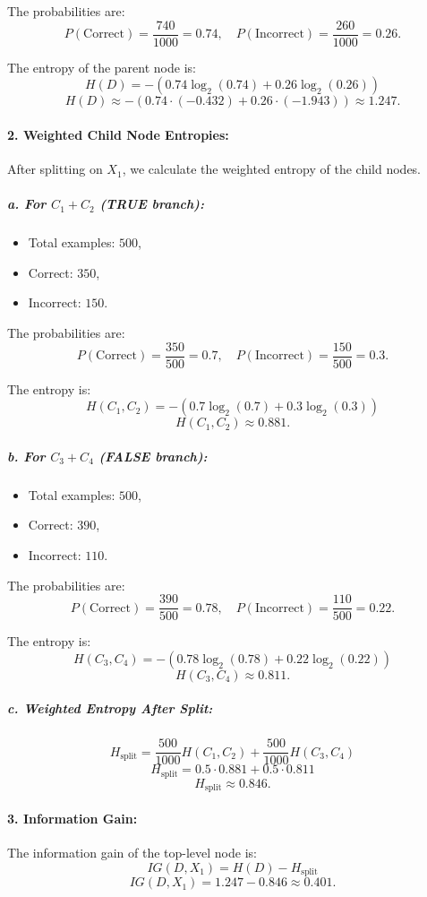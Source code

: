 \documentclass[10pt,a4paper]{article}
\begin{document}
The probabilities are:
\[
P(\text{Correct}) = \frac{740}{1000} = 0.74, \quad P(\text{Incorrect}) = \frac{260}{1000} = 0.26.
\]

The entropy of the parent node is:
\[
H(D) = - \left( 0.74 \log_2(0.74) + 0.26 \log_2(0.26) \right)
\]
\[
H(D) \approx - \left( 0.74 \cdot (-0.432) + 0.26 \cdot (-1.943) \right) \approx 1.247.
\]

\paragraph{2. Weighted Child Node Entropies:}
After splitting on \(X_1\), we calculate the weighted entropy of the child nodes.

\subparagraph{a. For \(C_1 + C_2\) (TRUE branch):}
\begin{itemize}
    \item Total examples: \(500\),
    \item Correct: \(350\),
    \item Incorrect: \(150\).
\end{itemize}

The probabilities are:
\[
P(\text{Correct}) = \frac{350}{500} = 0.7, \quad P(\text{Incorrect}) = \frac{150}{500} = 0.3.
\]

The entropy is:
\[
H(C_1, C_2) = - \left( 0.7 \log_2(0.7) + 0.3 \log_2(0.3) \right)
\]
\[
H(C_1, C_2) \approx 0.881.
\]

\subparagraph{b. For \(C_3 + C_4\) (FALSE branch):}
\begin{itemize}
    \item Total examples: \(500\),
    \item Correct: \(390\),
    \item Incorrect: \(110\).
\end{itemize}

The probabilities are:
\[
P(\text{Correct}) = \frac{390}{500} = 0.78, \quad P(\text{Incorrect}) = \frac{110}{500} = 0.22.
\]

The entropy is:
\[
H(C_3, C_4) = - \left( 0.78 \log_2(0.78) + 0.22 \log_2(0.22) \right)
\]
\[
H(C_3, C_4) \approx 0.811.
\]

\subparagraph{c. Weighted Entropy After Split:}
\[
H_{\text{split}} = \frac{500}{1000} H(C_1, C_2) + \frac{500}{1000} H(C_3, C_4)
\]
\[
H_{\text{split}} = 0.5 \cdot 0.881 + 0.5 \cdot 0.811
\]
\[
H_{\text{split}} \approx 0.846.
\]

\paragraph{3. Information Gain:}
The information gain of the top-level node is:
\[
IG(D, X_1) = H(D) - H_{\text{split}}
\]
\[
IG(D, X_1) = 1.247 - 0.846 \approx 0.401.
\]
\end{document}
